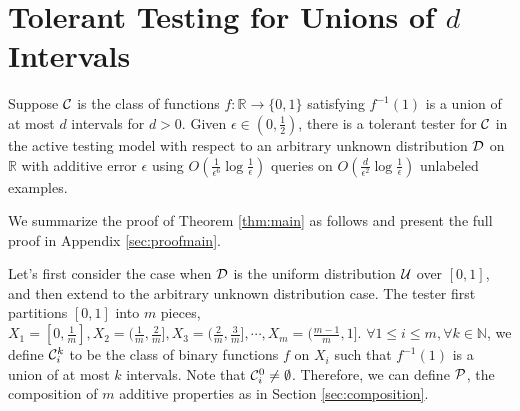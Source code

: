 \section{Tolerant Testing for Unions of $d$ Intervals}
\label{sec:interval}

\begin{theorem}
\label{thm:main}
Suppose ${\mathcal{C}}$ is the class of functions $f:\mathbb{R}\rightarrow \{0,1\}$ satisfying $f^{-1}(1)$ is a union of at most $d$ intervals for $d>0$. Given $\epsilon\in(0,\frac 12)$, there is a tolerant tester for ${\mathcal{C}}$ in the active testing model with respect to an arbitrary unknown distribution ${\mathcal{D}}$ on $\mathbb{R}$ with additive error $\epsilon$ using $O(\frac{1}{\epsilon^6}\log\frac{1}{\epsilon})$ queries on $O(\frac{d}{\epsilon^2}\log\frac{1}{\epsilon})$ unlabeled examples.
\end{theorem}

We summarize the proof of Theorem \ref{thm:main} as follows and present the full proof in Appendix \ref{sec:proofmain}.

Let's first consider the case when ${\mathcal{D}}$ is the uniform distribution ${\mathcal{U}}$ over $[0,1]$, and then extend to the arbitrary unknown distribution case. The tester first partitions $[0,1]$ into $m$ pieces, $X_1=[0,\frac{1}{m}],X_2=(\frac{1}{m},\frac{2}{m}],X_3=(\frac{2}{m},\frac{3}{m}],\cdots,X_m=(\frac{m-1}{m},1]$. $\forall 1\leq i\leq m,\forall k\in\mathbb{N}$, we define ${\mathcal{C}}_i^k$ to be the class of binary functions $f$ on $X_i$ such that $f^{-1}(1)$ is a union of at most $k$ intervals. Note that ${\mathcal{C}}_i^0\neq\emptyset$. Therefore, we can define ${\mathcal{P}}$, the composition of $m$ additive properties as in Section \ref{sec:composition}. 

